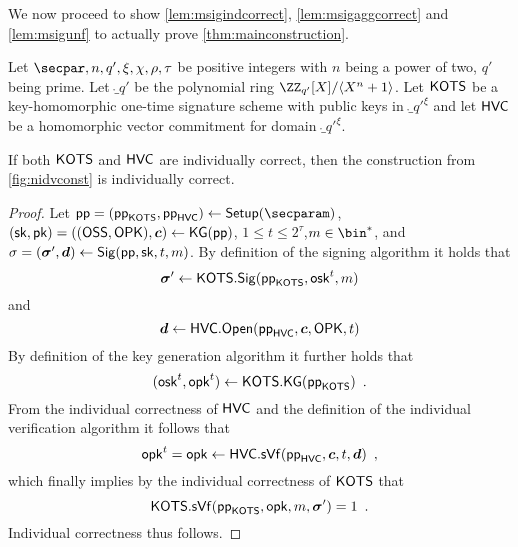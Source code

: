 \bigskip\noindent
We now proceed to show \autoref{lem:msigindcorrect}, \autoref{lem:msigaggcorrect} and \autoref{lem:msigunf} to actually prove \autoref{thm:mainconstruction}.
\begin{lemma}\label{lem:msigindcorrect}
Let $\secpar,n,q',\xi,\chi,\rho,\tau$ be positive integers with $n$ being a power of two, $q'$ being prime.
Let $\ring_{q'}$ be the polynomial ring $\defringqq$.
Let $\mathsf{KOTS}$ be a key-homomorphic one-time signature scheme with public keys in $\ring_{q'}^\xi$ and let $\mathsf{HVC}$ be a homomorphic vector commitment for domain $\ring_{q'}^\xi$.

If both $\mathsf{KOTS}$ and $\mathsf{HVC}$ are individually correct, then the construction from \autoref{fig:nidvconst} is individually correct.
\end{lemma}
\begin{proof}
  Let $\params=(\hotsparams,\hvcparams)\gets\setup(\secparam)$, $(\mathsf{sk},\mathsf{pk}) = ((\mathsf{OSS},\mathsf{OPK}),\boldsymbol{c})\gets\mathsf{KG}(\mathsf{pp})$, $1\leq t\leq 2^\tau$,$m\in\bin^*$, and $\sigma = (\boldsymbol{\sigma}',\boldsymbol{d}) \gets \mathsf{Sig}(\mathsf{pp},\mathsf{sk},t,m)$.
  By definition of the signing algorithm it holds that
  \[
    \boldsymbol{\sigma}' \gets \mathsf{KOTS}.\mathsf{Sig}(\mathsf{pp}_{\mathsf{KOTS}},\mathsf{osk}^t,m)
  \]
  and 
  \[
   \boldsymbol{d} \gets \mathsf{HVC}.\mathsf{Open}(\mathsf{pp}_{\mathsf{HVC}},\boldsymbol{c},\mathsf{OPK},t)
  \]
  By definition of the key generation algorithm it further holds that
  \[
    (\mathsf{osk}^t,\mathsf{opk}^t) \gets \mathsf{KOTS}.\mathsf{KG}(\mathsf{pp}_{\mathsf{KOTS}})\enspace.
  \]
  From the individual correctness of $\mathsf{HVC}$ and the definition of the individual verification algorithm it follows that
  \[
    \mathsf{opk}^t = \mathsf{opk} \gets \mathsf{HVC}.\mathsf{sVf}(\mathsf{pp}_{\mathsf{HVC}},\boldsymbol{c},t,\boldsymbol{d})\enspace,
  \]
  which finally implies by the individual correctness of $\mathsf{KOTS}$ that
  \[
    \mathsf{KOTS}.\mathsf{sVf}(\mathsf{pp}_{\mathsf{KOTS}},\mathsf{opk},m,\boldsymbol{\sigma}') = 1\enspace.
  \]
  Individual correctness thus follows.
\end{proof}

